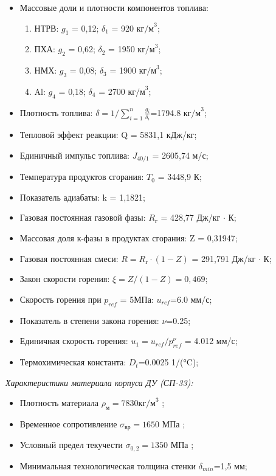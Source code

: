 \begin{itemize}
	\item Массовые доли и плотности компонентов топлива:
	\begin{enumerate}[1.]
		\item НТРВ:  		$g_1$ = 0,12; 		$\delta_1$ = 920  $\text{кг/м}^3$;
		\item ПХА:			$g_2$ = 0,62;		$\delta_2$ = 1950 $\text{кг/м}^3$;
		\item НМХ:			$g_3$ = 0,08;		$\delta_3$ = 1900 $\text{кг/м}^3$;
		\item Al:			$g_4$ = 0,18;		$\delta_4$ = 2700 $\text{кг/м}^3$;
	\end{enumerate}
	\item Плотность топлива:			$\delta=1/\sum_{i=1}^n \frac{g_i}{\delta_i} $=1794.8  $\text{кг/м}^3$;
	\item Тепловой эффект реакции:				Q = 5831,1 кДж/кг;
	\item Единичный импульс топлива:				$J_{40/1}$ = 2605,74 м/с;
	\item Температура продуктов сгорания:			$T_0$ = 3448,9 К;
	\item Показатель адиабаты:					k = 1,1821;
	\item Газовая постоянная газовой фазы:			$R_\text{г}$ = 428,77 Дж/кг $\cdot$ К;
	\item Массовая доля к-фазы в продуктах сгорания:	Z = 0,31947;
	\item Газовая постоянная смеси:		$R = R_\text{г}\cdot(1−Z)$ = 291,791 Дж/кг $\cdot$ К;
	\item Закон скорости горения:	$\xi=Z/(1-Z)=0,469$;
	\item Скорость горения при $p_{ref}$ = 5МПа:	$	u_{ref}$=6.0  мм/с;
	\item Показатель в степени закона горения:		$\nu$=0.25;
	\item Единичная скорость горения: $u_1=u_{ref} / p_{ref}^\nu$ = 4.012  мм/с;
	\item Термохимическая константа:				$D_t$=0.0025  1/(°C);
\end{itemize}

\emph{Характеристики материала корпуса ДУ (СП-33):}

\begin{itemize}
	\item Плотность материала					$\rho_\text{м}=7830  \text{кг/м}^3$ ;
	\item Временное сопротивление				$\sigma_\text{вр}=1650$ МПа ;
	\item Условный предел текучести			$\sigma_{0,2}=1350$ МПа ;
	\item Минимальная технологическая толщина стенки	$\delta_{min}$=1,5 мм;
\end{itemize}


